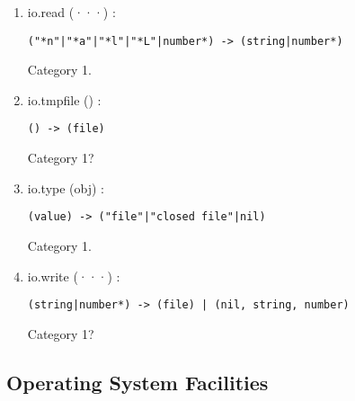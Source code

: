 \begin{enumerate}
\begin{verbatim}
(string, "r"|"w"|nil) -> (file) | (nil, string, number)
\end{verbatim}
Category 1?
\item io.read (···) :
\begin{verbatim}
("*n"|"*a"|"*l"|"*L"|number*) -> (string|number*)
\end{verbatim}
Category 1.
\item io.tmpfile () :
\begin{verbatim}
() -> (file)
\end{verbatim}
Category 1?
\item io.type (obj) :
\begin{verbatim}
(value) -> ("file"|"closed file"|nil)
\end{verbatim}
Category 1.
\item io.write (···) :
\begin{verbatim}
(string|number*) -> (file) | (nil, string, number)
\end{verbatim}
Category 1?
\end{enumerate}

\subsection{Operating System Facilities}

